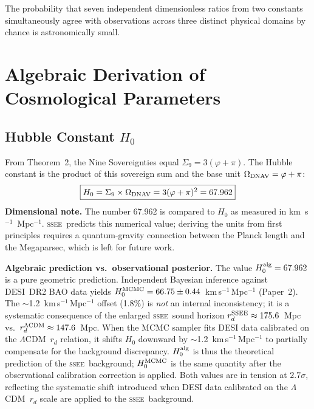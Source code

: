 \documentclass[12pt,a4paper]{article}
\newcommand{\SSEE}{\ifmmode\mathrm{SSEE}\else\textsc{ssee}\fi}
\newcommand{\LCDM}{\ifmmode\Lambda\mathrm{CDM}\else$\Lambda$CDM\fi}
\begin{document}
The probability that seven independent dimensionless ratios from two
constants simultaneously agree with observations across three distinct
physical domains by chance is astronomically small.

\section{Algebraic Derivation of Cosmological Parameters}
\label{sec:derivations}

\subsection{Hubble Constant \texorpdfstring{$H_0$}{H0}}
\label{sec:h0}

From Theorem~2, the Nine Sovereignties equal $\Sigma_9 = 3(\varphi+\pi)$.
The Hubble constant is the product of this sovereign sum and the base unit
$\Omega_{\rm DNAV} = \varphi+\pi$:
\begin{equation}
\boxed{H_0 = \Sigma_9 \times \Omega_{\rm DNAV} = 3(\varphi+\pi)^2 = 67.962}
\label{eq:H0}
\end{equation}
\textbf{Dimensional note.} The number 67.962 is compared to $H_0$ as measured
in km~s$^{-1}$~Mpc$^{-1}$.  \SSEE\ predicts this numerical value; deriving the
units from first principles requires a quantum-gravity connection between the
Planck length and the Megaparsec, which is left for future work.

\textbf{Algebraic prediction vs.\ observational posterior.}
The value $H_0^{\rm alg}=67.962$ is a pure geometric prediction.
Independent Bayesian inference against DESI~DR2 BAO data yields
$H_0^{\rm MCMC}=66.75\pm0.44$~km\,s$^{-1}$\,Mpc$^{-1}$ (Paper~2).
The $\sim$1.2~km\,s$^{-1}$\,Mpc$^{-1}$ offset (1.8\%) is \emph{not} an
internal inconsistency; it is a systematic consequence of the enlarged
\SSEE\ sound horizon $r_d^{\rm SSEE}\approx175.6$~Mpc vs.\
$r_d^{\rm \Lambda CDM}\approx147.6$~Mpc.
When the MCMC sampler fits DESI data calibrated on the \LCDM\ $r_d$
relation, it shifts $H_0$ downward by $\sim$1.2~km\,s$^{-1}$\,Mpc$^{-1}$
to partially compensate for the background discrepancy.
$H_0^{\rm alg}$ is thus the theoretical prediction of the \SSEE\ background;
$H_0^{\rm MCMC}$ is the same quantity after the observational calibration
correction is applied.
Both values are in tension at $2.7\sigma$, reflecting the systematic shift introduced when DESI data calibrated on the \LCDM\ $r_d$ scale are applied to the \SSEE\ background.
\end{document}
